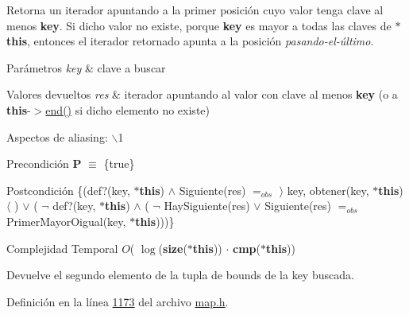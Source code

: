 \-Retorna un iterador apuntando a la primer posición cuyo valor tenga clave al menos {\bfseries key}. \-Si dicho valor no existe, porque {\bfseries key} es mayor a todas las claves de {\bfseries $\ast$this}, entonces el iterador retornado apunta a la posición {\itshape pasando-\/el-\/último\/}.


\begin{DoxyParams}{\-Parámetros}
{\em key} & clave a buscar \\
\hline
\end{DoxyParams}

\begin{DoxyRetVals}{\-Valores devueltos}
{\em res} & iterador apuntando al valor con clave al menos {\bfseries key} (o a {\bfseries this}-\/$>$\hyperlink{classaed2_1_1map_a76023e6a56cb625513e1b5ea028bf983_a76023e6a56cb625513e1b5ea028bf983}{end()} si dicho elemento no existe)\\
\hline
\end{DoxyRetVals}
\begin{DoxyParagraph}{\-Aspectos de aliasing\-:}
$\backslash$1
\end{DoxyParagraph}
\begin{DoxyPrecond}{\-Precondición}
{\bfseries \-P} $\equiv$ \{true\} 
\end{DoxyPrecond}
\begin{DoxyPostcond}{\-Postcondición}
\{(def?(key, {\bfseries $\ast$this}) $\land$ \-Siguiente(res) $=_{obs}$ $\rangle$ key, obtener(key, {\bfseries $\ast$this}) $\langle$ ) $\lor$ ( $\lnot$ def?(key, {\bfseries $\ast$this}) $\land$ ( $\lnot$ \-Hay\-Siguiente(res) $\lor$ \-Siguiente(res) $=_{obs}$ \-Primer\-Mayor\-Oigual(key, {\bfseries $\ast$this})))\}
\end{DoxyPostcond}

\begin{DoxyDescription}
\item[\-Complejidad \-Temporal]$O$( $\log$({\bfseries size}({\bfseries $\ast$this})) $\cdot$ {\bfseries cmp}({\bfseries $\ast$this}))
\end{DoxyDescription}

\-Devuelve el segundo elemento de la tupla de bounds de la key buscada. 

\-Definición en la línea \hyperlink{map_8h_source_l01173}{1173} del archivo \hyperlink{map_8h_source}{map.\-h}.

